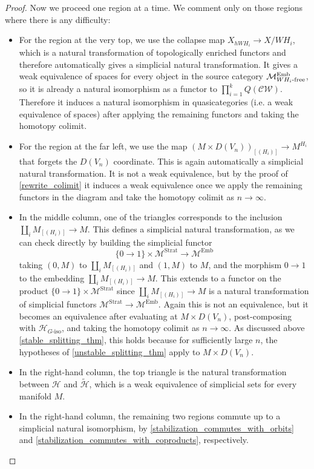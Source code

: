 \documentclass[11pt]{amsart}
\theoremstyle{definition}
\numberwithin{equation}{section}
\numberwithin{figure}{section}
\newcommand{\ra}{\longrightarrow}
\newcommand{\mc}{\mathcal}
\newcommand{\Man}{\mc M^\mathrm{Emb}}
\newcommand{\Manstr}{\mc M^\mathrm{Strat}}
\newcommand{\dashiso}{\textrm{-}\mathrm{iso}}
\begin{document}
\begin{proof}
Now we proceed one region at a time. We comment only on those regions where there is any difficulty:
\begin{itemize}
	\item For the region at the very top, we use the collapse map $X_{hWH_i} \to X/WH_i$, which is a natural transformation of topologically enriched functors and therefore automatically gives a simplicial natural transformation. It gives a weak equivalence of spaces for every object in the source category $\Man_{\textup{$WH_i$-free}}$, so it is already a natural isomorphism as a functor to $\prod_{i=1}^k Q(\mc{CW})$. Therefore it induces a natural isomorphism in quasicategories (i.e. a weak equivalence of spaces) after applying the remaining functors and taking the homotopy colimit.
	\item For the region at the far left, we use the map $(M \times D(V_n))_{[(H_i)]} \to M^{H_i}$ that forgets the $D(V_n)$ coordinate. This is again automatically a simplicial natural transformation. It is not a weak equivalence, but by the proof of \autoref{rewrite_colimit} it induces a weak equivalence once we apply the remaining functors in the diagram and take the homotopy colimit as $n\to\infty$.
	\item In the middle column, one of the triangles corresponds to the inclusion $\coprod_i M_{[(H_i)]} \to M$. This defines a simplicial natural transformation, as we can check directly by building the simplicial functor
	\[ \{0 \to 1\} \times \Manstr \ra \Man \]
	taking $(0,M)$ to $\coprod_i M_{[(H_i)]}$ and $(1,M)$ to $M$, and the morphism $0 \to 1$ to the embedding $\coprod_i M_{[(H_i)]} \to M$. This extends to a functor on the product $\{0 \to 1\} \times \Manstr$ since $\coprod_i M_{[(H_i)]} \to M$ is a natural transformation of simplicial functors $\Manstr \to \Man$. Again this is not an equivalence, but it becomes an equivalence after evaluating at $M \times D(V_n)$, post-composing with $\mc H_{G\dashiso}$, and taking the homotopy colimit as $n \to \infty$. As discussed above \autoref{stable_splitting_thm}, this holds because for sufficiently large $n$, the hypotheses of \autoref{unstable_splitting_thm} apply to $M \times D(V_n)$.
	\item In the right-hand column, the top triangle is the natural transformation between $\mc H$ and $\widetilde{\mc H}$, which is a weak equivalence of simplicial sets for every manifold $M$.
	\item In the right-hand column, the remaining two regions commute up to a simplicial natural isomorphism, by \autoref{stabilization_commutes_with_orbits} and \autoref{stabilization_commutes_with_coproducts}, respectively.
\end{itemize}
\end{proof}
\end{document}
